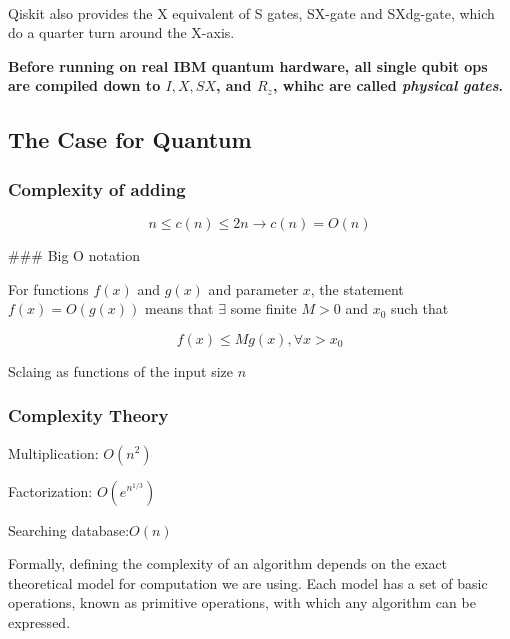 \documentclass[11pt]{article}
\begin{document}
    \begin{center}
    \end{center}
    { \hspace*{\fill} \\}
    

    Qiskit also provides the X equivalent of S gates, SX-gate and SXdg-gate,
which do a quarter turn around the X-axis.

\textbf{Before running on real IBM quantum hardware, all single qubit
ops are compiled down to \(I,X, SX\), and \(R_z\), whihc are called
\emph{physical gates}.}

    \hypertarget{the-case-for-quantum}{%
\subsection{The Case for Quantum}\label{the-case-for-quantum}}

    \hypertarget{complexity-of-adding}{%
\subsubsection{Complexity of adding}\label{complexity-of-adding}}

\[n \leq c(n) \leq 2n \longrightarrow c(n) = O(n)\]

\#\#\# Big O notation

For functions \(f(x)\) and \(g(x)\) and parameter \(x\), the statement
\(f(x) = O(g(x))\) means that \(\exists\) some finite \(M>0\) and
\(x_0\) such that

\[
 f(x) \leq Mg(x), \forall x > x_0
 \]

    Sclaing as functions of the input size \(n\)

    \hypertarget{complexity-theory}{%
\subsubsection{Complexity Theory}\label{complexity-theory}}

Multiplication: \(O(n^2)\)

Factorization: \(O(e^{n^{1/3}})\)

Searching database:\(O(n)\)

    Formally, defining the complexity of an algorithm depends on the exact
theoretical model for computation we are using. Each model has a set of
basic operations, known as primitive operations, with which any
algorithm can be expressed.
\end{document}
